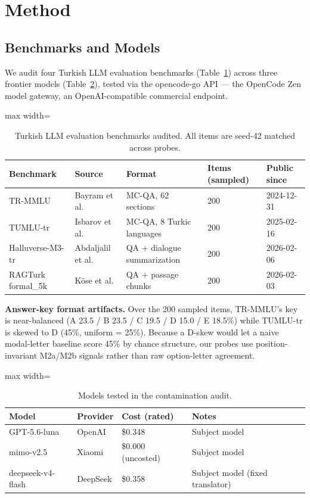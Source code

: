 \documentclass[letterpaper]{article}
\begin{document}
\section{Method}

\subsection{Benchmarks and Models}
We audit four Turkish LLM evaluation benchmarks (Table~\ref{tab:benchmarks}) across three frontier models (Table~\ref{tab:models}), tested via the opencode-go API --- the OpenCode Zen model gateway, an OpenAI-compatible commercial endpoint.

\begin{table}[t]
\centering
\begin{adjustbox}{max width=\textwidth}
\begin{tabular}{lllll}
\toprule
\textbf{Benchmark} & \textbf{Source} & \textbf{Format} & \textbf{Items (sampled)} & \textbf{Public since} \\
\midrule
TR-MMLU & Bayram et al. \cite{trmmu2024} & MC-QA, 62 sections & 200 & 2024-12-31 \\
TUMLU-tr & Isbarov et al. \cite{tumlu2025} & MC-QA, 8 Turkic languages & 200 & 2025-02-16 \\
Halluverse-M3-tr & Abdaljalil et al. \cite{halluverse2026} & QA + dialogue summarization & 200 & 2026-02-06 \\
RAGTurk formal\_5k & K{\"o}se et al. \cite{ragturk2026} & QA + passage chunks & 200 & 2026-02-03 \\
\bottomrule
\end{tabular}%
\end{adjustbox}
\caption{Turkish LLM evaluation benchmarks audited. All items are seed-42 matched across probes.}
\label{tab:benchmarks}
\end{table}

\noindent\textbf{Answer-key format artifacts.} Over the 200 sampled items, TR-MMLU's key is near-balanced (A 23.5 / B 23.5 / C 19.5 / D 15.0 / E 18.5\%) while TUMLU-tr is skewed to D (45\%, uniform = 25\%). Because a D-skew would let a naive modal-letter baseline score 45\% by chance structure, our probes use position-invariant M2a/M2b signals rather than raw option-letter agreement.

\begin{table}[t]
\centering
\begin{adjustbox}{max width=\textwidth}
\begin{tabular}{llll}
\toprule
\textbf{Model} & \textbf{Provider} & \textbf{Cost (rated)} & \textbf{Notes} \\
\midrule
GPT-5.6-luna & OpenAI & \$0.348 & Subject model \\
mimo-v2.5 & Xiaomi & \$0.000 (uncosted) & Subject model \\
deepseek-v4-flash & DeepSeek & \$0.358 & Subject model (fixed translator) \\
\bottomrule
\end{tabular}%
\end{adjustbox}
\caption{Models tested in the contamination audit.}
\label{tab:models}
\end{table}
\end{document}
